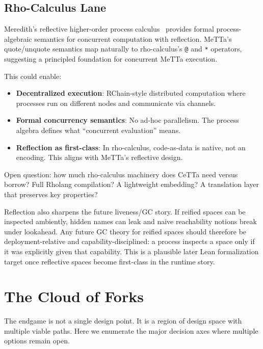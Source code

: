 \documentclass[11pt]{article}
\newcommand{\code}[1]{\texttt{#1}}
\newcommand{\CeTTa}{\textup{CeTTa}}
\begin{document}
\subsection{Rho-Calculus Lane}

Meredith's reflective higher-order process calculus~\cite{Meredith2005}
provides formal process-algebraic semantics for concurrent computation
with reflection.  MeTTa's quote/unquote semantics map naturally to
rho-calculus's \code{@} and \code{*} operators, suggesting a principled
foundation for concurrent MeTTa execution.

This could enable:
\begin{itemize}
\item \textbf{Decentralized execution}: RChain-style distributed computation
  where processes run on different nodes and communicate via channels.
\item \textbf{Formal concurrency semantics}: No ad-hoc parallelism.  The
  process algebra defines what ``concurrent evaluation'' means.
\item \textbf{Reflection as first-class}: In rho-calculus, code-as-data is
  native, not an encoding.  This aligns with MeTTa's reflective design.
\end{itemize}

Open question: how much rho-calculus machinery does \CeTTa{} need versus
borrow?  Full Rholang compilation?  A lightweight embedding?  A translation
layer that preserves key properties?

Reflection also sharpens the future liveness/GC story.  If reified
spaces can be inspected ambiently, hidden names can leak and naive
reachability notions break under lookahead.  Any future GC theory for
reified spaces should therefore be deployment-relative and
capability-disciplined: a process inspects a space only if it was
explicitly given that capability.  This is a plausible later Lean
formalization target once reflective spaces become first-class in the
runtime story.

\section{The Cloud of Forks}
\label{sec:forks}

The endgame is not a single design point.  It is a region of design
space with multiple viable paths.  Here we enumerate the major decision
axes where multiple options remain open.
\end{document}
